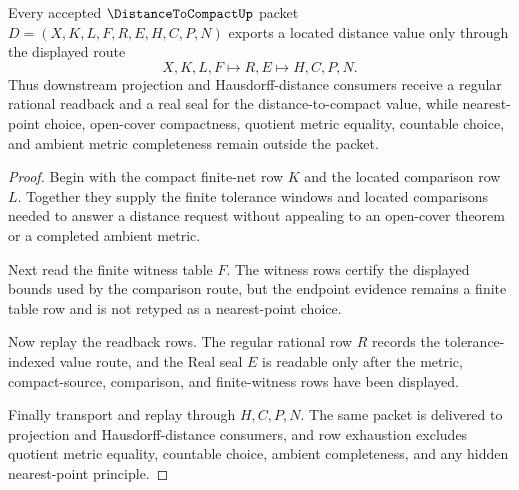 \begin{theorem}
\label{thm:distance-to-compact-located-readback}
Every accepted $\DistanceToCompactUp$ packet $D=(X,K,L,F,R,E,H,C,P,N)$ exports a located distance value only through the displayed route
$$
X,K,L,F \longmapsto R,E \longmapsto H,C,P,N .
$$
Thus downstream projection and Hausdorff-distance consumers receive a regular rational readback and a real seal for the distance-to-compact value, while nearest-point choice, open-cover compactness, quotient metric equality, countable choice, and ambient metric completeness remain outside the packet.
\end{theorem}
\begin{proof}
Begin with the compact finite-net row $K$ and the located comparison row $L$. Together they supply the finite tolerance windows and located comparisons needed to answer a distance request without appealing to an open-cover theorem or a completed ambient metric.

Next read the finite witness table $F$. The witness rows certify the displayed bounds used by the comparison route, but the endpoint evidence remains a finite table row and is not retyped as a nearest-point choice.

Now replay the readback rows. The regular rational row $R$ records the tolerance-indexed value route, and the Real seal $E$ is readable only after the metric, compact-source, comparison, and finite-witness rows have been displayed.

Finally transport and replay through $H,C,P,N$. The same packet is delivered to projection and Hausdorff-distance consumers, and row exhaustion excludes quotient metric equality, countable choice, ambient completeness, and any hidden nearest-point principle.
\end{proof}


